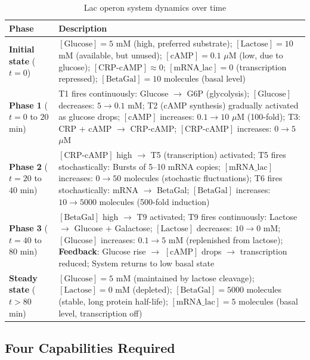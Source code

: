 \begin{table}[htbp]
\centering
\caption{Lac operon system dynamics over time}
\label{tab:lac-dynamics}
\begin{tabular}{lp{9cm}}
\toprule
\textbf{Phase} & \textbf{Description} \\
\midrule
\textbf{Initial state} ($t=0$) & 
$[\text{Glucose}] = 5$ mM (high, preferred substrate); 
$[\text{Lactose}] = 10$ mM (available, but unused);
$[\text{cAMP}] = 0.1$ $\mu$M (low, due to glucose);
$[\text{CRP-cAMP}] \approx 0$;
$[\text{mRNA\_lac}] = 0$ (transcription repressed);
$[\text{BetaGal}] = 10$ molecules (basal level) \\
\midrule
\textbf{Phase 1} ($t=0$ to $20$ min) & 
T1 fires continuously: Glucose $\to$ G6P (glycolysis);
$[\text{Glucose}]$ decreases: $5 \to 0.1$ mM;
T2 (cAMP synthesis) gradually activated as glucose drops;
$[\text{cAMP}]$ increases: $0.1 \to 10$ $\mu$M (100-fold);
T3: CRP + cAMP $\to$ CRP-cAMP;
$[\text{CRP-cAMP}]$ increases: $0 \to 5$ $\mu$M \\
\midrule
\textbf{Phase 2} ($t=20$ to $40$ min) & 
$[\text{CRP-cAMP}]$ high $\to$ T5 (transcription) activated;
T5 fires stochastically: Bursts of 5--10 mRNA copies;
$[\text{mRNA\_lac}]$ increases: $0 \to 50$ molecules (stochastic fluctuations);
T6 fires stochastically: mRNA $\to$ BetaGal;
$[\text{BetaGal}]$ increases: $10 \to 5000$ molecules (500-fold induction) \\
\midrule
\textbf{Phase 3} ($t=40$ to $80$ min) & 
$[\text{BetaGal}]$ high $\to$ T9 activated;
T9 fires continuously: Lactose $\to$ Glucose + Galactose;
$[\text{Lactose}]$ decreases: $10 \to 0$ mM;
$[\text{Glucose}]$ increases: $0.1 \to 5$ mM (replenished from lactose);
\textbf{Feedback}: Glucose rise $\to$ $[\text{cAMP}]$ drops $\to$ transcription reduced;
System returns to low basal state \\
\midrule
\textbf{Steady state} ($t > 80$ min) & 
$[\text{Glucose}] = 5$ mM (maintained by lactose cleavage);
$[\text{Lactose}] = 0$ mM (depleted);
$[\text{BetaGal}] = 5000$ molecules (stable, long protein half-life);
$[\text{mRNA\_lac}] = 5$ molecules (basal level, transcription off) \\
\bottomrule
\end{tabular}
\end{table}

\subsection{Four Capabilities Required}
\label{subsec:lac-capabilities}

